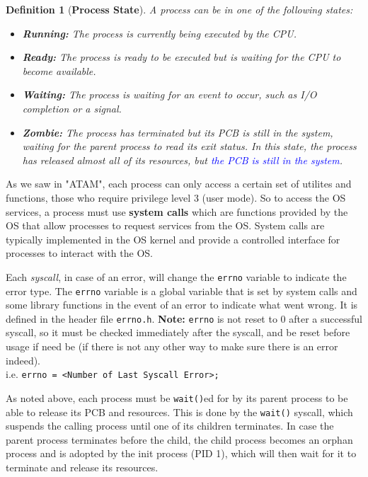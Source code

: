 \documentclass[openany,12pt]{book}
\newtheorem*{definition}{Definition}
\newcommand{\code}[1]{\texttt{#1}}
\begin{document}
\begin{definition}
    [\textbf{Process State}]
    A process can be in one of the following states:
    \begin{itemize}
        \item \textbf{Running:} The process is currently being executed by the CPU.
        \item \textbf{Ready:} The process is ready to be executed but is waiting for the CPU to become available.
        \item \textbf{Waiting:} The process is waiting for an event to occur, such as I/O completion or a signal.
        \item \textbf{Zombie:} The process has terminated but its PCB is still in the system, waiting for the parent process to read its exit status. In this state, the process has released almost all of its resources, but \textcolor{blue}{the PCB is still in the system}.
    \end{itemize}
\end{definition}


As we saw in "ATAM", each process can only access a certain set of utilites and functions, those who require privilege level 3 (user mode). So to access the OS services, a process must use \textbf{system calls} which are functions provided by the OS that allow processes to request services from the OS. System calls are typically implemented in the OS kernel and provide a controlled interface for processes to interact with the OS.

\vspace{1em}

Each \textit{syscall}, in case of an error, will change the \texttt{errno} variable to indicate the error type. The \texttt{errno} variable is a global variable that is set by system calls and some library functions in the event of an error to indicate what went wrong. It is defined in the header file \texttt{errno.h}. {\color{blue}\textbf{Note:} \texttt{errno} is not reset to 0 after a successful syscall, so it must be checked immediately after the syscall, and be reset before usage if need be} (if there is not any other way to make sure there is an error indeed).\\
i.e. \texttt{errno = <Number of Last Syscall Error>;}

\vspace{1em}

As noted above, each process must be \code{wait()}ed for by its parent process to be able to release its PCB and resources. This is done by the \texttt{wait()} syscall, which suspends the calling process until one of its children terminates. In case {\color{red} the parent process terminates before the child}, the child process {\color{red} becomes an orphan process and is adopted by the init process (PID 1)}, which will then wait for it to terminate and release its resources.
\end{document}
